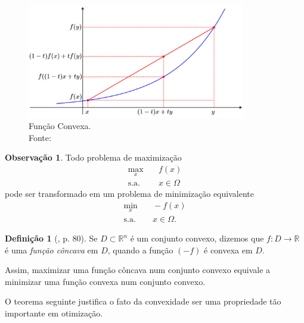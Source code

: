 \documentclass[12pt,a4paper]{scrartcl}
\def\RR{\mathds{R}}
\theoremstyle{definition}%
\newtheorem{defi}{Definição}
\newtheorem{obs}{Observação}
\begin{document}
\begin{figure}[!h] 
	\centering
	\includegraphics[width=0.85\textwidth]{funcao_convexa}
	\caption{ Função Convexa. \label{fig_funcao_convexa} \\ Fonte: \textcite{Evelin2017}}
\end{figure}

\begin{obs}
Todo problema de maximização
\[
\begin{aligned}
\max_{x} & \quad f(x) \\
\text{s.a.} & \quad x \in \Omega \end{aligned}
 \]
pode ser transformado em um problema de minimização equivalente
\[
\begin{aligned}
\min_{x} & \quad -f(x) \\
\text{s.a.} & \quad x \in \Omega .\end{aligned}
 \]
\end{obs}

\begin{defi} [\textcite{Izmailov2014ac}, p. 80]
Se $D \subset \RR^{n}$ é um conjunto convexo, dizemos que $f: D \rightarrow \RR $ é uma \emph{função côncava} em $D$, quando a função $(-f)$ é convexa em $D$.
\end{defi}

Assim, maximizar uma função côncava num conjunto convexo equivale a minimizar uma função convexa num conjunto convexo.

O teorema seguinte justifica o fato da convexidade ser uma propriedade tão importante em otimização. 
\end{document}
